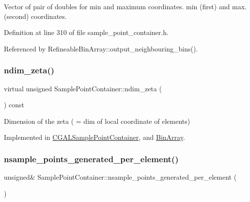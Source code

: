 Vector of pair of doubles for min and maximum coordinates. min (first) and max. (second) coordinates. 



Definition at line 310 of file sample\+\_\+point\+\_\+container.\+h.



Referenced by Refineable\+Bin\+Array\+::output\+\_\+neighbouring\+\_\+bins().

\mbox{\label{classSamplePointContainer_af2cfee8a92a28addb59a5533dfd138e7}} 
\subsubsection{\texorpdfstring{ndim\+\_\+zeta()}{ndim\_zeta()}}
{\footnotesize\ttfamily virtual unsigned Sample\+Point\+Container\+::ndim\+\_\+zeta (\begin{DoxyParamCaption}{ }\end{DoxyParamCaption}) const\hspace{0.3cm}{\ttfamily [pure virtual]}}



Dimension of the zeta ( = dim of local coordinate of elements) 



Implemented in \hyperlink{classCGALSamplePointContainer_a0fb2970a09f9fa0e21b04cbf7690a5a2}{C\+G\+A\+L\+Sample\+Point\+Container}, and \hyperlink{classBinArray_a8e0c4a67385d7dcc714de95ce9965f34}{Bin\+Array}.

\mbox{\label{classSamplePointContainer_a48e5ae762e0d56f67645ce4e7dd886d7}} 
\subsubsection{\texorpdfstring{nsample\+\_\+points\+\_\+generated\+\_\+per\+\_\+element()}{nsample\_points\_generated\_per\_element()}}
{\footnotesize\ttfamily unsigned\& Sample\+Point\+Container\+::nsample\+\_\+points\+\_\+generated\+\_\+per\+\_\+element (\begin{DoxyParamCaption}{ }\end{DoxyParamCaption})\hspace{0.3cm}{\ttfamily [inline]}}



